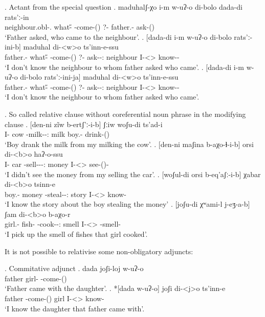 \ex. Actant from the special question
	\ag. maduhalʃ-χo i-m w-uʔ-o di-bolo dada-di rats'ː-in\\
			{neighbour.obl-\Add.\Lat} {what-\H} {\M-come-\Pst(\Aor)} {?-\Indef} {father.\Obl-\Erg} {ask-\Pst(\Aor)}\\
			\glt `Father asked, who came to the neighbour'.
	\bg. [dada-di i-m w-uʔ-o di-bolo rats'ː-ini-b]  maduhal di-<w>o ts'inn-e-ssu\\
		{father.\Obl-\Erg}  {what-\H} {\M-come-\Pst(\Aor)} {?-\Indef} {ask-\Pst-\Ptcp:\Pst} neighbour {I-<\M>\Aff} {know-\Hab-\Neg}\\
		\glt `I don't know the neighbour to whom father asked who came'.
	\bg. [dada-di i-m w-uʔ-o di-bolo rats'ː-ini-ja]  maduhal di-<w>o ts'inn-e-ssu\\
		{father.\Obl-\Erg}  {what-\H} {\M-come-\Pst(\Aor)} {?-\Indef} {ask-\Npst-\Ptcp:\Prae} neighbour {I-<\M>\Aff} {know-\Hab-\Neg}\\
		\glt `I don't know the neighbour to whom father asked who came'.

\ex. So called relative clause without coreferential noun phrase in the modifying clause
	\ag. [den-ni zĩw b-ertʃ'ː-i-b] ʃːiw woʃu-di ts'ad-i\\
			{I-\Erg} cow {\An-milk-\Pst-\Ptcp:\Pst} milk {boy.\Obl-\Erg} {drink-\Pst(\Aor)}\\
			\glt `Boy drank the milk from my milking the cow'.
	\bg. [den-ni maʃina b-aχo-ɬ-i-b] orsi di-<b>o haʔ-o-ssu\\
			 {I-\Erg}  car {\Nanf-sell-\Caus-\Pst-\Ptcp:\Pst} money {I-<\Nanf>\Aff} {see-\Pst(\Aor)-\Neg}\\
			 \glt `I didn't see the money from my selling the car'.
	\bg. [woʃul-di orsi b-eq'aʃː-i-b] χabar di-<b>o tsinn-e\\
			{boy.\Obl-\Erg} money {\Nanf-steal-\Pst-\Ptcp:\Pst} story {I-<\Nanf>\Aff} {know-\Hab}\\
			\glt `I know the story about the boy stealing the money'
	\bg. [joʃu-di χʷami-l j-eʒ-a-b] ʃam di-<b>o b-aχo-r\\
			{girl.\Obl-\Erg} {fish-\Pl} {\F-cook-\Pst-\Ptcp:\Pst} smell {I-<\Nanf>\Aff} {\Nanf-smell-\Prog}\\
			\glt `I pick up the smell of fishes that girl cooked'.
			 
It is not possible to relativise some non-obligatory adjuncts:

\ex. Commitative adjunct
	\ag. dada joʃi-loj w-uʔ-o\\
			father {girl-\Com} {\M-come-\Pst(\Aor)}\\
			\glt `Father came with the daughter'.	
	\bg. *[dada w-uʔ-o] joʃi di-<j>o ts'inn-e\\
			father {\M-come-\Pst(\Aor)} girl {I-<\F>\Aff} {know-\Hab}\\
			\glt `I know the daughter that father came with'.


